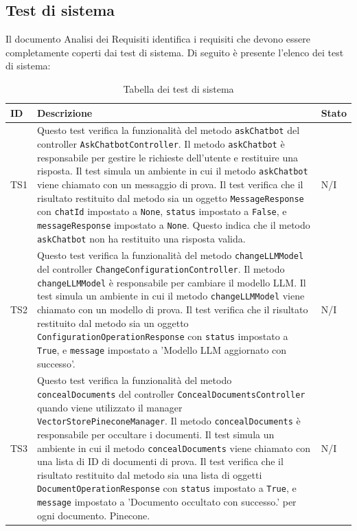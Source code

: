 \documentclass[10pt, a4paper]{article}
\begin{document}
\subsection{Test di sistema}
Il documento Analisi dei Requisiti identifica i requisiti che devono essere completamente coperti dai test di sistema. Di seguito è presente l'elenco dei test di sistema:
\renewcommand{\arraystretch}{1.5}
\begin{xltabular}{\textwidth}{p{0.12\textwidth}|X|p{0.12\textwidth}}

    \caption{Tabella dei test di sistema}
    \label{tab:test_sistema}\\
    \textbf{ID} & \textbf{Descrizione} & \textbf{Stato}  \\
    \hline
    
    TS1 & Questo test verifica la funzionalità del metodo \texttt{askChatbot} del controller \texttt{AskChatbotController}. Il metodo \texttt{askChatbot} è responsabile per gestire le richieste dell'utente e restituire una risposta. Il test simula un ambiente in cui il metodo \texttt{askChatbot} viene chiamato con un messaggio di prova. Il test verifica che il risultato restituito dal metodo sia un oggetto \texttt{MessageResponse} con \texttt{chatId} impostato a \texttt{None}, \texttt{status} impostato a \texttt{False}, e \texttt{messageResponse} impostato a \texttt{None}. Questo indica che il metodo \texttt{askChatbot} non ha restituito una risposta valida. & N/I \\
    \hline
    TS2 & Questo test verifica la funzionalità del metodo \texttt{changeLLMModel} del controller \texttt{ChangeConfigurationController}. Il metodo \texttt{changeLLMModel} è responsabile per cambiare il modello LLM. Il test simula un ambiente in cui il metodo \texttt{changeLLMModel} viene chiamato con un modello di prova. Il test verifica che il risultato restituito dal metodo sia un oggetto \texttt{ConfigurationOperationResponse} con \texttt{status} impostato a \texttt{True}, e \texttt{message} impostato a 'Modello LLM aggiornato con successo'. & N/I \\
    \hline
    TS3 & Questo test verifica la funzionalità del metodo \texttt{concealDocuments} del controller \texttt{ConcealDocumentsController} quando viene utilizzato il manager \texttt{VectorStorePineconeManager}. Il metodo \texttt{concealDocuments} è responsabile per occultare i documenti. Il test simula un ambiente in cui il metodo \texttt{concealDocuments} viene chiamato con una lista di ID di documenti di prova. Il test verifica che il risultato restituito dal metodo sia una lista di oggetti \texttt{DocumentOperationResponse} con \texttt{status} impostato a \texttt{True}, e \texttt{message} impostato a 'Documento occultato con successo.' per ogni documento. Pinecone. & N/I \\

\end{xltabular}
\end{document}
